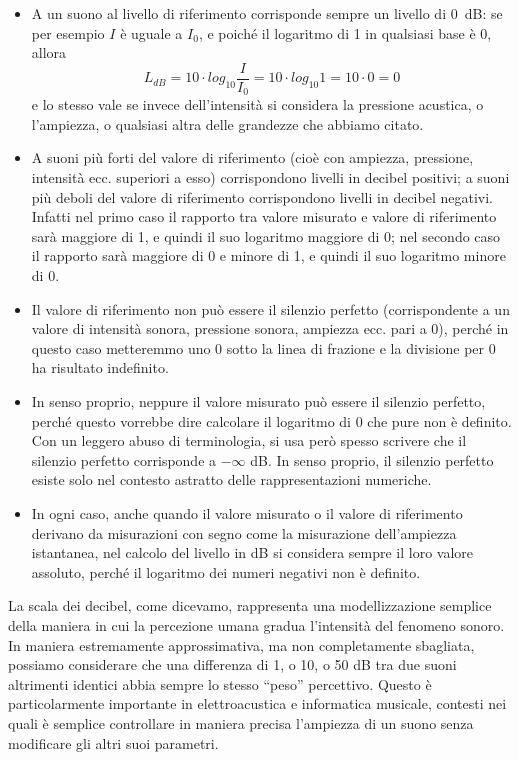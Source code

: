 \begin{itemize}

\item A un suono al livello di riferimento corrisponde sempre un livello di \qty{0}{dB}: se per esempio $I$ è uguale a $I_0$, e poiché il logaritmo di 1 in qualsiasi base è 0, allora
\begin{equation}
L_{dB} = 10 \cdot log_{10}\frac{I}{I_0} = 10 \cdot log_{10}1 = 10 \cdot 0 = 0
\end{equation}
e lo stesso vale se invece dell'intensità si considera la pressione acustica, o l'ampiezza, o qualsiasi altra delle grandezze che abbiamo citato.

\item A suoni più forti del valore di riferimento (cioè con ampiezza, pressione, intensità ecc. superiori a esso) corrispondono livelli in decibel positivi; a suoni più deboli del valore di riferimento corrispondono livelli in decibel negativi. Infatti nel primo caso il rapporto tra valore misurato e valore di riferimento sarà maggiore di 1, e quindi il suo logaritmo maggiore di 0; nel secondo caso il rapporto sarà maggiore di 0 e minore di 1, e quindi il suo logaritmo minore di 0.

\item Il valore di riferimento non può essere il silenzio perfetto (corrispondente a un valore di intensità sonora, pressione sonora, ampiezza ecc. pari a 0), perché in questo caso metteremmo uno 0 sotto la linea di frazione e la divisione per 0 ha risultato indefinito.

\item In senso proprio, neppure il valore misurato può essere il silenzio perfetto, perché questo vorrebbe dire calcolare il logaritmo di 0 che pure non è definito. Con un leggero abuso di terminologia, si usa però spesso scrivere che il silenzio perfetto corrisponde a $-\infty$ dB. In senso proprio, il silenzio perfetto esiste solo nel contesto astratto delle rappresentazioni numeriche.

\item In ogni caso, anche quando il valore misurato o il valore di riferimento derivano da misurazioni con segno come la misurazione dell'ampiezza istantanea, nel calcolo del livello in dB si considera sempre il loro valore assoluto, perché il logaritmo dei numeri negativi non è definito.

\end{itemize}

La scala dei decibel, come dicevamo, rappresenta una modellizzazione semplice della maniera in cui la percezione umana gradua l'intensità del fenomeno sonoro. In maniera estremamente approssimativa, ma non completamente sbagliata, possiamo considerare che una differenza di 1, o 10, o 50 dB tra due suoni altrimenti identici abbia sempre lo stesso ``peso'' percettivo. Questo è particolarmente importante in elettroacustica e informatica musicale, contesti nei quali è semplice controllare in maniera precisa l'ampiezza di un suono senza modificare gli altri suoi parametri. 



